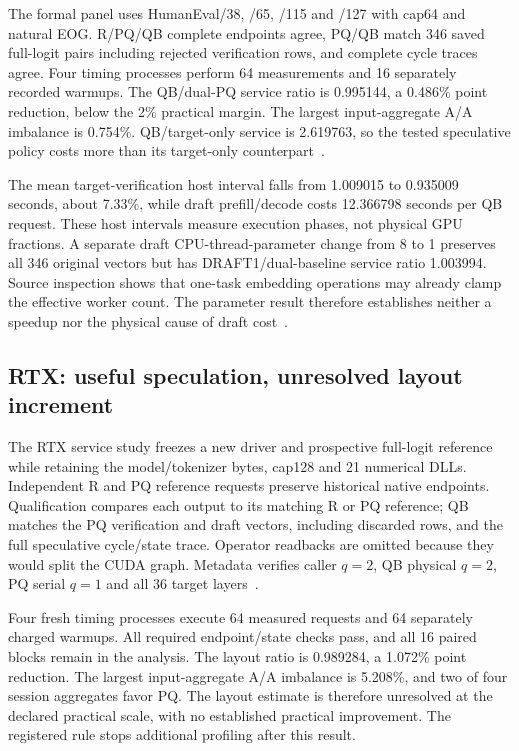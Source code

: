 The formal panel uses HumanEval/38, /65, /115 and /127 with cap64 and natural EOG. R/PQ/QB complete endpoints agree, PQ/QB match 346 saved full-logit pairs including rejected verification rows, and complete cycle traces agree. Four timing processes perform 64 measurements and 16 separately recorded warmups. The QB/dual-PQ service ratio is 0.995144, a 0.486\% point reduction, below the 2\% practical margin. The largest input-aggregate A/A imbalance is 0.754\%. QB/target-only service is 2.619763, so the tested speculative policy costs more than its target-only counterpart~\cite{b570servicerecords}.

The mean target-verification host interval falls from 1.009015 to 0.935009 seconds, about 7.33\%, while draft prefill/decode costs 12.366798 seconds per QB request. These host intervals measure execution phases, not physical GPU fractions. A separate draft CPU-thread-parameter change from 8 to 1 preserves all 346 original vectors but has DRAFT1/dual-baseline service ratio 1.003994. Source inspection shows that one-task embedding operations may already clamp the effective worker count. The parameter result therefore establishes neither a speedup nor the physical cause of draft cost~\cite{b570policyrecords}.

\subsection{RTX: useful speculation, unresolved layout increment}
The RTX service study freezes a new driver and prospective full-logit reference while retaining the model/tokenizer bytes, cap128 and 21 numerical DLLs. Independent R and PQ reference requests preserve historical native endpoints. Qualification compares each output to its matching R or PQ reference; QB matches the PQ verification and draft vectors, including discarded rows, and the full speculative cycle/state trace. Operator readbacks are omitted because they would split the CUDA graph. Metadata verifies caller $q=2$, QB physical $q=2$, PQ serial $q=1$ and all 36 target layers~\cite{rtxservicerecords}.

Four fresh timing processes execute 64 measured requests and 64 separately charged warmups. All required endpoint/state checks pass, and all 16 paired blocks remain in the analysis. The layout ratio is 0.989284, a 1.072\% point reduction. The largest input-aggregate A/A imbalance is 5.208\%, and two of four session aggregates favor PQ. The layout estimate is therefore unresolved at the declared practical scale, with no established practical improvement. The registered rule stops additional profiling after this result.

